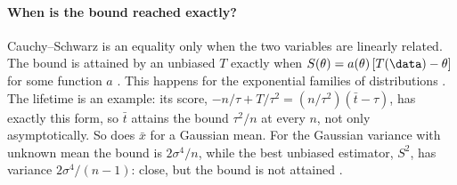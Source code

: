 \paragraph{When is the bound reached exactly?}
Cauchy--Schwarz is an equality only when the two variables are linearly
related. The bound is attained by an unbiased $T$ exactly when
$S(\theta)=a(\theta)\,[T(\data)-\theta]$ for some function $a$
. This happens for the exponential
families of distributions . The lifetime is an example: its
score, $-n/\tau+T/\tau^2=(n/\tau^2)(\bar t-\tau)$, has exactly this form,
so $\bar t$ attains the bound $\tau^2/n$ at every $n$, not only
asymptotically. So does $\bar x$ for a Gaussian mean. For the Gaussian
variance with unknown mean the bound is $2\sigma^4/n$, while the best
unbiased estimator, $S^2$, has variance $2\sigma^4/(n-1)$: close, but the
bound is not attained .

